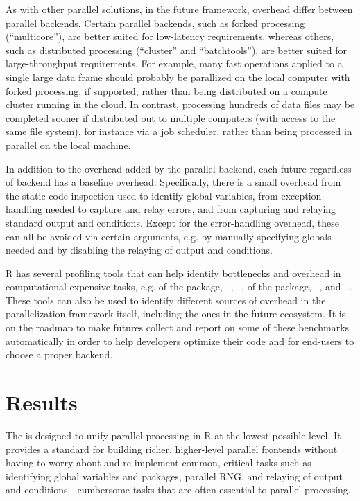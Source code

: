 As with other parallel solutions, in the future framework, overhead
differ between parallel backends.  Certain parallel backends, such as
forked processing (``multicore''), are better suited for low-latency
requirements, whereas others, such as distributed processing
(``cluster'' and ``batchtools''), are better suited for
large-throughput requirements.  For example, many fast operations
applied to a single large data frame should probably be parallized on
the local computer with forked processing, if supported, rather than
being distributed on a compute cluster running in the cloud.  In
contrast, processing hundreds of data files may be completed sooner if
distributed out to multiple computers (with access to the same file
system), for instance via a job scheduler, rather than being processed
in parallel on the local machine.

In addition to the overhead added by the parallel backend, each future
regardless of backend has a baseline overhead.  Specifically, there is
a small overhead from the static-code inspection used to identify
global variables, from exception handling needed to capture and relay
errors, and from capturing and relaying standard output and
conditions.  Except for the error-handling overhead, these can all be
avoided via certain  arguments, e.g. by manually
specifying globals needed and by disabling the relaying of output
and conditions.

R has several profiling tools that can help identify bottlenecks and
overhead in computational expensive tasks, e.g. 
of the  package,
~\citep{CRAN:microbenchmark},
~\citep{CRAN:bench},
 of the  package,
~\citep{CRAN:proffer}, and
~\citep{CRAN:profvis}.  These tools can also be
used to identify different sources of overhead in the parallelization
framework itself, including the ones in the future ecosystem.  It is
on the roadmap to make futures collect and report on some of these
benchmarks automatically in order to help developers optimize their
code and for end-users to choose a proper backend.


\section{Results}
\label{results}

The  is designed to unify parallel processing in R at
the lowest possible level.  It provides a standard for building
richer, higher-level parallel frontends without having to worry about
and re-implement common, critical tasks such as identifying global
variables and packages, parallel RNG, and relaying of output and
conditions - cumbersome tasks that are often essential to parallel
processing.

